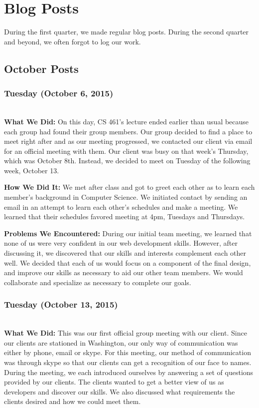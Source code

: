 \documentclass[onecolumn]{IEEEtran}
\begin{document}
\section{Blog Posts}
During the first quarter, we made regular blog posts. During the second quarter and beyond, we often forgot to log our work.

\subsection{October Posts}
\subsubsection{Tuesday (October 6, 2015)} \hspace*{\fill} \\
    \textbf{What We Did: }
    On this day, CS 461's lecture ended earlier than usual because each group had found their group members. Our group decided to find a place to meet right after and as our meeting progressed, we contacted our client via email for an official meeting with them. Our client was busy on that week's Thursday, which was October 8th. Instead, we decided to meet on Tuesday of the following week, October 13.  
    
    \textbf{How We Did It: } 
    We met after class and got to greet each other as to learn each member's background in Computer Science. We initiated contact by sending an email in an attempt to learn each other's schedules and make a meeting. We learned that their schedules favored meeting at 4pm, Tuesdays and Thursdays.  
    
    \textbf{Problems We Encountered: } 
    During our initial team meeting, we learned that none of us were very confident in our web development skills. However, after discussing it, we discovered that our skills and interests complement each other well. We decided that each of us would focus on a component of the final design, and improve our skills as necessary to aid our other team members. We would collaborate and specialize as necessary to complete our goals.  

\subsubsection{Tuesday (October 13, 2015)} \hspace*{\fill} \\
    \textbf{What We Did: }
    This was our first official group meeting with our client. Since our clients are stationed in Washington, our only way of communication was either by phone, email or skype. For this meeting, our method of communication was through skype so that our clients can get a recognition of our face to names. During the meeting, we each introduced ourselves by answering a set of questions provided by our clients. The clients wanted to get a better view of us as developers and discover our skills. We also discussed what requirements the clients desired and how we could meet them.  
\end{document}
